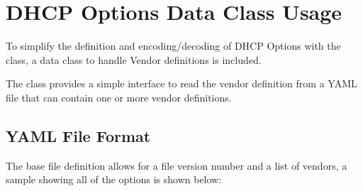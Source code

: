 \documentclass[letterpaper,10pt,english]{sphinxmanual}
\begin{document}
\section{DHCP Options Data Class Usage}
\label{\detokenize{dhcp-option-data-class-usage:dhcp-options-data-class-usage}}\label{\detokenize{dhcp-option-data-class-usage::doc}}
\sphinxAtStartPar
To simplify the definition and encoding/decoding of DHCP Options with the
{\hyperref[\detokenize{dhcp_encode-class:bloxone.dhcp_encode}]{}} class, a data class to handle Vendor definitions
is included.

\sphinxAtStartPar
The {\hyperref[\detokenize{dhcp-option-data-class:bloxone.DHCP_OPTION_DEFS}]{}} class provides a simple interface to
read the vendor definition from a YAML file that can contain one or more
vendor definitions.


\subsection{YAML File Format}
\label{\detokenize{dhcp-option-data-class-usage:yaml-file-format}}
\sphinxAtStartPar
The base file definition allows for a file version number and a list of
vendors, a sample showing all of the options is shown below:
\end{document}
